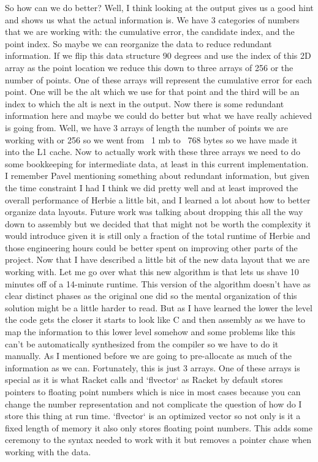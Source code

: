 \documentclass{article}
\begin{document}
So how can we do better? Well, I think looking at the output gives us a good hint and shows us what the actual information is. We have 3 categories of numbers that we are working with: the cumulative error, the candidate index, and the point index. So maybe we can reorganize the data to reduce redundant information. If we flip this data structure 90 degrees and use the index of this 2D array as the point location we reduce this down to three arrays of 256 or the number of points. One of these arrays will represent the cumulative error for each point. One will be the alt which we use for that point and the third will be an index to which the alt is next in the output. Now there is some redundant information here and maybe we could do better but what we have really achieved is going from. Well, we have 3 arrays of length the number of points we are working with or 256 so we went from ~1 mb to ~768 bytes so we have made it into the L1 cache.
Now to actually work with these three arrays we need to do some bookkeeping for intermediate data, at least in this current implementation. I remember Pavel mentioning something about redundant information, but given the time constraint I had I think we did pretty well and at least improved the overall performance of Herbie a little bit, and I learned a lot about how to better organize data layouts. Future work was talking about dropping this all the way down to assembly but we decided that that might not be worth the complexity it would introduce given it is still only a fraction of the total runtime of Herbie and those engineering hours could be better spent on improving other parts of the project.
Now that I have described a little bit of the new data layout that we are working with. Let me go over what this new algorithm is that lets us shave 10 minutes off of a 14-minute runtime. This version of the algorithm doesn’t have as clear distinct phases as the original one did so the mental organization of this solution might be a little harder to read. But as I have learned the lower the level the code gets the closer it starts to look like C and then assembly as we have to map the information to this lower level somehow and some problems like this can’t be automatically synthesized from the compiler so we have to do it manually. As I mentioned before we are going to pre-allocate as much of the information as we can. Fortunately, this is just 3 arrays. One of these arrays is special as it is what Racket calls and `flvector` as Racket by default stores pointers to floating point numbers which is nice in most cases because you can change the number representation and not complicate the question of how do I store this thing at run time. `flvector` is an optimized vector so not only is it a fixed length of memory it also only stores floating point numbers. This adds some ceremony to the syntax needed to work with it but removes a pointer chase when working with the data. 
\end{document}
